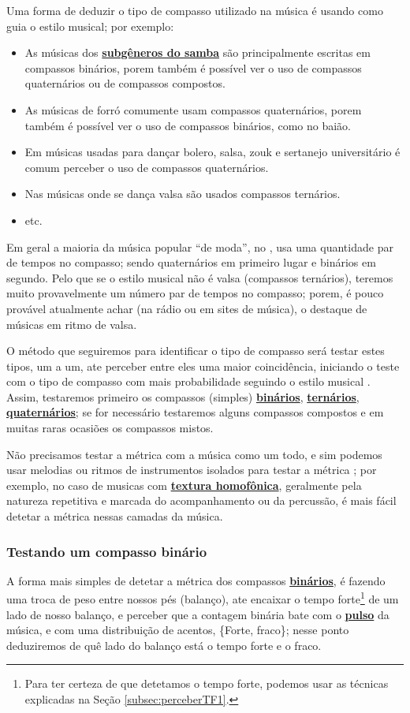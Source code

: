 Uma forma de deduzir o tipo de compasso utilizado na música  é usando como guia o estilo musical; por exemplo:
\begin{itemize}
\item As músicas dos \hyperref[sec:FamiliaSamba]{\textbf{subgêneros do samba}} 
são principalmente escritas em compassos binários,
porem também é possível ver o uso de compassos quaternários ou de compassos compostos.
\item As músicas de forró comumente usam compassos quaternários,
porem também é possível ver o uso de compassos binários, como no baião. 
\item Em músicas usadas para dançar bolero, salsa, zouk 
e sertanejo universitário é comum perceber o uso de compassos quaternários.
\item Nas músicas onde se dança valsa são usados compassos ternários.
\item etc.
\end{itemize}
Em geral a maioria da música popular ``de moda'', no \AnoLivro, usa uma quantidade par de tempos no compasso;
sendo quaternários em primeiro lugar e binários em segundo.
Pelo que se o estilo musical não é valsa (compassos ternários), 
teremos muito provavelmente um número par de tempos no compasso;
porem, é  pouco provável atualmente achar (na rádio ou em sites de música),
o destaque de músicas em ritmo de valsa.

O método que seguiremos para identificar o tipo de compasso será testar estes tipos,
um a um, ate perceber entre eles uma maior coincidência,
iniciando o teste com o tipo de compasso com mais probabilidade seguindo o estilo musical \cite[pp. 10]{wright1992social}.
Assim, testaremos primeiro os compassos (simples)
\hyperref[subsec:compassobinario]{\textbf{binários}}, 
\hyperref[subsec:compassoternario]{\textbf{ternários}}, 
\hyperref[subsec:compassoquaternario]{\textbf{quaternários}};
se for necessário testaremos alguns compassos compostos 
e em muitas raras ocasiões os compassos mistos.

Não precisamos testar a métrica com a música como um todo,
e sim podemos usar melodias ou ritmos de instrumentos isolados para testar a métrica \cite[pp. 10]{wright1992social};
por exemplo, no caso de musicas com \hyperref[subsec:homofonica]{\textbf{textura homofônica}},
geralmente pela natureza repetitiva e marcada do acompanhamento ou da percussão,
é mais fácil detetar a métrica nessas camadas da música.

\subsubsection{Testando um compasso binário}
A forma mais simples de detetar a métrica dos compassos \hyperref[subsec:compassobinario]{\textbf{binários}},
é fazendo uma troca de peso entre nossos pés (balanço),
ate encaixar o tempo forte\footnote{Para ter certeza de que detetamos o tempo forte, 
podemos usar as técnicas explicadas na Seção \ref{subsec:perceberTF1}.} 
de um lado de nosso balanço,
e perceber que a contagem binária bate com o \hyperref[ref:Pulso]{\textbf{pulso}} da música,
e com uma distribuição de acentos, \{Forte, fraco\};
nesse ponto deduziremos de quê lado do balanço está o tempo forte e o fraco.

